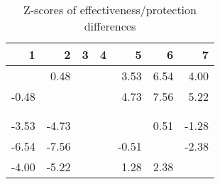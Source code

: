 \begin{table}[ht]
\centering
\begin{tabular}{rrrrrrr}
  \hline
1 & 2 & 3 & 4 & 5 & 6 & 7 \\ 
  \hline
 & 0.48 &  &  & 3.53 & 6.54 & 4.00 \\ 
  -0.48 &  &  &  & 4.73 & 7.56 & 5.22 \\ 
   &  &  &  &  &  &  \\ 
   &  &  &  &  &  &  \\ 
  -3.53 & -4.73 &  &  &  & 0.51 & -1.28 \\ 
  -6.54 & -7.56 &  &  & -0.51 &  & -2.38 \\ 
  -4.00 & -5.22 &  &  & 1.28 & 2.38 &  \\ 
   \hline
\end{tabular}
\caption{Z-scores of effectiveness/protection differences} 
\end{table}
